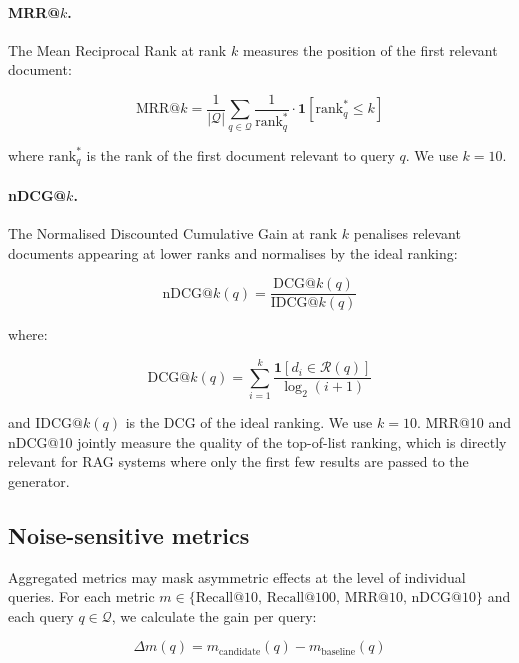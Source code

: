 \documentclass[a4paper,fleqn]{cas-dc}
\begin{document}
\paragraph{MRR@$k$.}
The Mean Reciprocal Rank at rank $k$ measures the position
of the first relevant document:

\begin{equation}
    \text{MRR@}k =
    \frac{1}{|\mathcal{Q}|}
    \sum_{q \in \mathcal{Q}}
    \frac{1}{\text{rank}_q^*}
    \cdot \mathbf{1}\left[\text{rank}_q^* \leq k\right]
\end{equation}

where $\text{rank}_q^*$ is the rank of the first document
relevant to query $q$. We use $k = 10$.

\paragraph{nDCG@$k$.}
The Normalised Discounted Cumulative Gain at rank $k$
penalises relevant documents appearing at
lower ranks and normalises by the ideal ranking:

\begin{equation}
    \text{nDCG@}k(q) =
    \frac{\text{DCG@}k(q)}{\text{IDCG@}k(q)}
\end{equation}

where:

\begin{equation}
    \text{DCG@}k(q) =
    \sum_{i=1}^{k}
    \frac{\mathbf{1}[d_i \in \mathcal{R}(q)]}
    {\log_2(i+1)}
\end{equation}

and $\text{IDCG@}k(q)$ is the DCG of the ideal ranking.
We use $k = 10$. MRR@10 and nDCG@10 jointly measure
the quality of the top-of-list ranking,
which is directly relevant for RAG systems
where only the first few results are passed to
the generator.

\subsection{Noise-sensitive metrics}

Aggregated metrics may mask
asymmetric effects at the level of individual queries.
For each metric
$m \in \{\text{Recall@10},\, \text{Recall@100},\,
\text{MRR@10},\, \text{nDCG@10}\}$
and each query $q \in \mathcal{Q}$, we calculate
the gain per query:

\begin{equation}
    \Delta m(q) =
    m_{\text{candidate}}(q) -
    m_{\text{baseline}}(q)
\end{equation}
\end{document}
